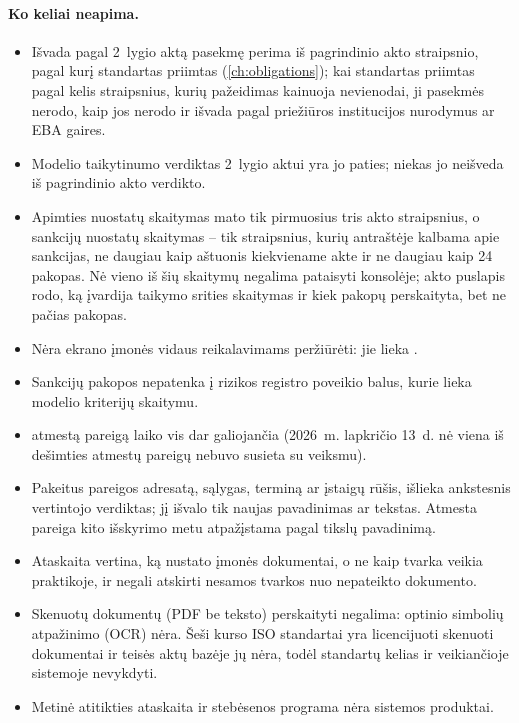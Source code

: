 \paragraph{Ko keliai neapima.}
\begin{itemize}
  \item Išvada pagal 2~lygio aktą pasekmę perima iš pagrindinio akto straipsnio, pagal kurį
    standartas priimtas (\cref{ch:obligations}); kai standartas priimtas pagal kelis
    straipsnius, kurių pažeidimas kainuoja nevienodai, ji pasekmės nerodo, kaip jos nerodo ir
    išvada pagal priežiūros institucijos nurodymus ar EBA gaires.
  \item Modelio taikytinumo verdiktas 2~lygio aktui yra jo paties; niekas jo neišveda iš
    pagrindinio akto verdikto.
  \item Apimties nuostatų skaitymas mato tik pirmuosius tris akto straipsnius, o sankcijų
    nuostatų skaitymas -- tik straipsnius, kurių antraštėje kalbama apie sankcijas, ne
    daugiau kaip aštuonis kiekviename akte ir ne daugiau kaip 24 pakopas. Nė vieno iš šių skaitymų
    negalima pataisyti konsolėje; akto puslapis rodo, ką įvardija taikymo srities skaitymas ir
    kiek pakopų perskaityta, bet ne pačias pakopas.
  \item Nėra ekrano įmonės vidaus reikalavimams peržiūrėti: jie lieka .
  \item Sankcijų pakopos nepatenka į rizikos registro poveikio balus, kurie lieka modelio
    kriterijų skaitymu.
  \item {} atmestą pareigą laiko vis dar galiojančia (2026~m.
    lapkričio 13~d. nė viena iš dešimties atmestų pareigų nebuvo susieta su veiksmu).
  \item Pakeitus pareigos adresatą, sąlygas, terminą ar įstaigų rūšis, išlieka ankstesnis
    vertintojo verdiktas; jį išvalo tik naujas pavadinimas ar tekstas. Atmesta pareiga kito
    išskyrimo metu atpažįstama pagal tikslų pavadinimą.
  \item Ataskaita vertina, ką nustato įmonės dokumentai, o ne kaip tvarka veikia praktikoje,
    ir negali atskirti nesamos tvarkos nuo nepateikto dokumento.
  \item Skenuotų dokumentų (PDF be teksto) perskaityti negalima: optinio simbolių atpažinimo (OCR) nėra.
    Šeši kurso ISO standartai yra licencijuoti skenuoti dokumentai ir teisės aktų bazėje jų
    nėra, todėl standartų kelias ir  veikiančioje
    sistemoje nevykdyti.
  \item Metinė atitikties ataskaita ir stebėsenos programa nėra sistemos produktai.
\end{itemize}

